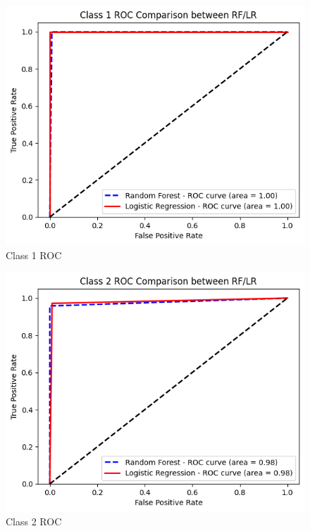 \documentclass[twocolumn]{article}
\begin{document}
	\begin{figure}[H]
		\centering
		\includegraphics[width=1\linewidth]{ROC C1.png}
		\caption{Class 1 ROC}
		\label{fig:roc-c1}
	\end{figure}

	\begin{figure}[H]
		\centering
		\includegraphics[width=1\linewidth]{ROC C2.png}
		\caption{Class 2 ROC}
		\label{fig:roc-c2}
	\end{figure}
\end{document}
